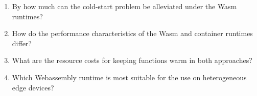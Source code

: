 \begin{enumerate}




  \item By how much can the cold-start problem be alleviated under the Wasm runtimes?

  \item How do the performance characteristics of the Wasm and container runtimes differ?

  \item What are the resource costs for keeping functions warm in both approaches?

  \item Which Webassembly runtime is most suitable for the use on heterogeneous edge devices?



\end{enumerate}

